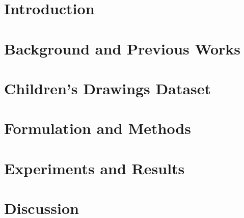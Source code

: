 \documentclass[a4paper,11pt,oneside]{report}
\begin{document}
\maketoc
\cleardoublepage


\pagestyle{headings}
\pagestyle{fancy}
\renewcommand{\headrulewidth}{2pt}
\renewcommand{\chaptermark}[1]{\markboth{#1}{#1}}
\renewcommand{\sectionmark}[1]{\markright{#1}}
\fancyhead[R]{\rightmark}
\fancyhead[L]{\chaptername\ \thechapter\ --\ \leftmark}


\chapter{Introduction}\label{chap:1:Intro}


\chapter{Background and Previous Works}\label{chap:2:Background}


\chapter{Children's Drawings Dataset}\label{chap:3:AboutDrawings}



\chapter{Formulation and Methods}


\chapter{Experiments and Results}


\chapter{Discussion}\label{chap:6:Discussion}

\end{document}
